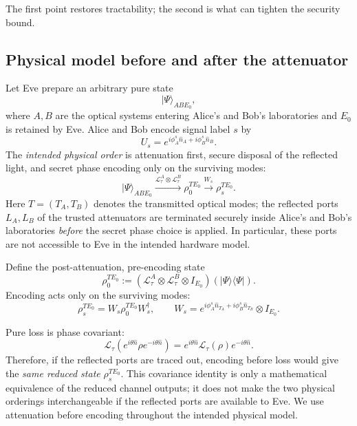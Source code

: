 \documentclass[11pt]{article}
\theoremstyle{remark}
\begin{document}
The first point restores tractability; the second is what can tighten the
security bound.

\subsection{Physical model before and after the attenuator}

Let Eve prepare an arbitrary pure state
\[
    |\Psi\rangle_{ABE_0},
\]
where \(A,B\) are the optical systems entering Alice's and Bob's laboratories
and \(E_0\) is retained by Eve.  Alice and Bob encode signal label \(s\) by
\[
    U_s
    =
    e^{i\phi_A^s\hat n_A+i\phi_B^s\hat n_B}.
\]
The \emph{intended physical order} is attenuation first, secure disposal of
the reflected light, and secret phase encoding only on the surviving modes:
\[
    |\Psi\rangle_{ABE_0}
    \xrightarrow{\mathcal L_\tau^A\otimes\mathcal L_\tau^B}
    \rho_0^{TE_0}
    \xrightarrow{W_s}
    \rho_s^{TE_0}.
\]
Here \(T=(T_A,T_B)\) denotes the transmitted optical modes; the reflected
ports \(L_A,L_B\) of the trusted attenuators are terminated securely inside
Alice's and Bob's laboratories \emph{before} the secret phase choice is
applied.  In particular, these ports are not accessible to Eve in the
intended hardware model.

Define the post-attenuation, pre-encoding state
\begin{equation}
    \rho_0^{TE_0}
    :=
    \left(
      \mathcal L_\tau^A\otimes\mathcal L_\tau^B\otimes I_{E_0}
    \right)
    \left(
      |\Psi\rangle\!\langle\Psi|
    \right).
    \label{eq:stage2-base-mixed}
\end{equation}
Encoding acts only on the surviving modes:
\begin{equation}
    \rho_s^{TE_0}
    =
    W_s\rho_0^{TE_0}W_s^\dagger,
    \qquad
    W_s
    =
    e^{i\phi_A^s\hat n_{T_A}+i\phi_B^s\hat n_{T_B}}
    \otimes I_{E_0}.
    \label{eq:stage2-unitary-orbit}
\end{equation}

Pure loss is phase covariant:
\begin{equation}
    \mathcal L_\tau
    \!\left(
      e^{i\theta\hat n}\rho e^{-i\theta\hat n}
    \right)
    =
    e^{i\theta\hat n}
    \mathcal L_\tau(\rho)
    e^{-i\theta\hat n}.
    \label{eq:stage2-covariance}
\end{equation}
Therefore, if the reflected ports are traced out, encoding before loss
would give the \emph{same reduced state} \(\rho_s^{TE_0}\).  This covariance
identity is only a mathematical equivalence of the reduced channel outputs;
it does not make the two physical orderings interchangeable if the
reflected ports are available to Eve.  We use attenuation before encoding
throughout the intended physical model.
\end{document}

